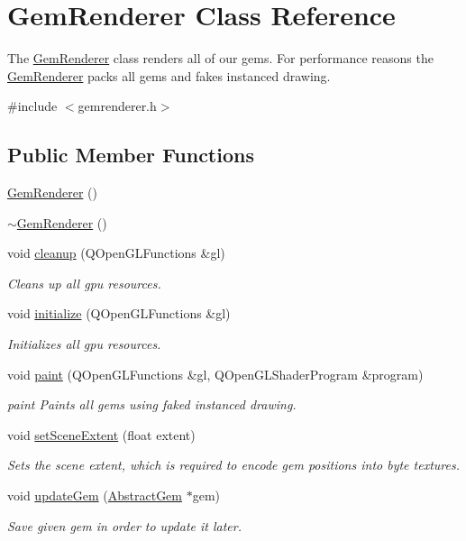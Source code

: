 \hypertarget{class_gem_renderer}{\section{Gem\+Renderer Class Reference}
\label{class_gem_renderer}
}


The \hyperlink{class_gem_renderer}{Gem\+Renderer} class renders all of our gems.  For performance reasons the \hyperlink{class_gem_renderer}{Gem\+Renderer} packs all gems and fakes instanced drawing.  




{\ttfamily \#include $<$gemrenderer.\+h$>$}

\subsection*{Public Member Functions}
\begin{DoxyCompactItemize}
\item 
\hyperlink{class_gem_renderer_ab7d20a029bd5b43a1a6f9ed660cfebd8}{Gem\+Renderer} ()
\item 
\hyperlink{class_gem_renderer_af66cf5ad414c21487c8513a8e5bf972a}{$\sim$\+Gem\+Renderer} ()
\item 
void \hyperlink{class_gem_renderer_a9da8103dc08a4203727b6967337fa65b}{cleanup} (Q\+Open\+G\+L\+Functions \&gl)
\begin{DoxyCompactList}\small\item\em Cleans up all gpu resources. \end{DoxyCompactList}\item 
void \hyperlink{class_gem_renderer_a2d4dc2d6f9b1aae7dc1e8b8d09b153de}{initialize} (Q\+Open\+G\+L\+Functions \&gl)
\begin{DoxyCompactList}\small\item\em Initializes all gpu resources. \end{DoxyCompactList}\item 
void \hyperlink{class_gem_renderer_a0a1765f07c953c05b1d7865f356b7ba2}{paint} (Q\+Open\+G\+L\+Functions \&gl, Q\+Open\+G\+L\+Shader\+Program \&program)
\begin{DoxyCompactList}\small\item\em paint Paints all gems using faked instanced drawing. \end{DoxyCompactList}\item 
void \hyperlink{class_gem_renderer_afdc5555e3e82c4a021deac461fffe435}{set\+Scene\+Extent} (float extent)
\begin{DoxyCompactList}\small\item\em Sets the scene extent, which is required to encode gem positions into byte textures. \end{DoxyCompactList}\item 
void \hyperlink{class_gem_renderer_a4be8d2a7b1443262392adc828f3910c8}{update\+Gem} (\hyperlink{class_abstract_gem}{Abstract\+Gem} $\ast$gem)
\begin{DoxyCompactList}\small\item\em Save given gem in order to update it later. \end{DoxyCompactList}\end{DoxyCompactItemize}
